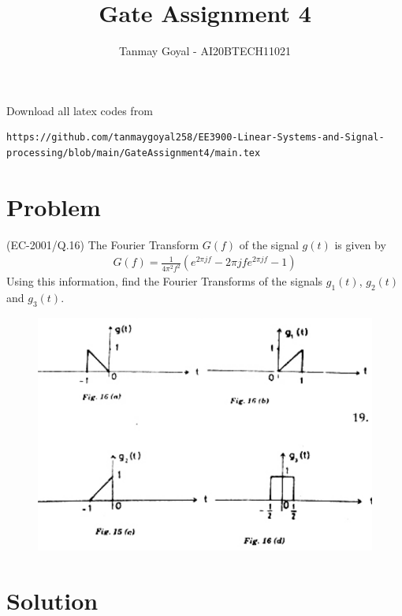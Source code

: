 \documentclass[journal,12pt,twocolumn]{IEEEtran}
\begin{document}
\def\putbox#1#2#3{\makebox[0in][l]{\makebox[#1][l]{}\raisebox{\baselineskip}[0in][0in]{\raisebox{#2}[0in][0in]{#3}}}}
     \def\rightbox#1{\makebox[0in][r]{#1}}
     \def\centbox#1{\makebox[0in]{#1}}
     \def\topbox#1{\raisebox{-\baselineskip}[0in][0in]{#1}}
     \def\midbox#1{\raisebox{-0.5\baselineskip}[0in][0in]{#1}}
\vspace{3cm}
\title{Gate Assignment 4}
\author{Tanmay Goyal - AI20BTECH11021}
\maketitle
\newpage
\bigskip
\renewcommand{\thefigure}{\theenumi}
\renewcommand{\thetable}{\theenumi}

Download all latex codes from 
\begin{lstlisting}
https://github.com/tanmaygoyal258/EE3900-Linear-Systems-and-Signal-processing/blob/main/GateAssignment4/main.tex
\end{lstlisting}
\section{Problem}
(EC-2001/Q.16) The Fourier Transform $G(f)$ of the signal $g(t)$ is given by 
\begin{align}
     G(f) = \frac{1}{4\pi^2 f^2}(e^{2\pi jf} - 2\pi jf e^{2\pi jf} -1)
\end{align}
Using this information, find the Fourier Transforms of the signals $g_1(t)$, $g_2(t)$ and $g_3(t)$.
\begin{figure}[!ht]
\centering
 \includegraphics[width=\columnwidth]{Question.png}
\end{figure}
\section{Solution}
\end{document}
